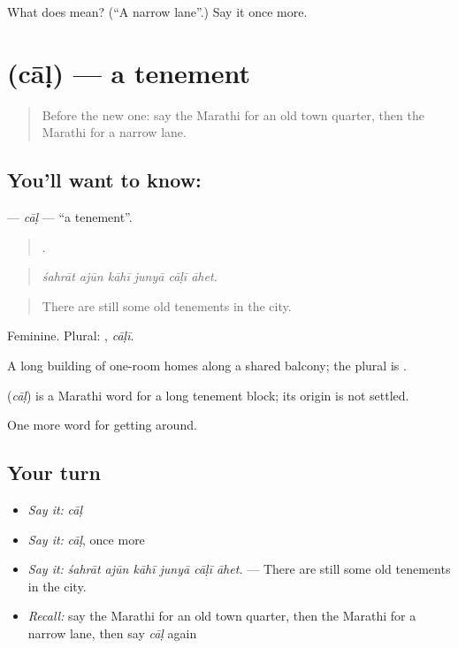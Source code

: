 \begin{tcolorbox}[breakable,colback=teal!4,colframe=teal!35!black,title={Before you move on}]
What does  mean? (\textquotedblleft{}A narrow lane\textquotedblright{}.) Say it once more.
\end{tcolorbox}
\section[\texorpdfstring{\mr{चाळ} (cāḷ)}{चाळ (cāḷ)}]{ (cāḷ) — a tenement}

\label{lesson:MR-C419-cal}



\begin{quote}
Before the new one: say the Marathi for an old town quarter, then the Marathi for a narrow lane.
\end{quote}

\subsection*{You'll want to know: }
\textbf{} — \emph{cāḷ} — \textquotedblleft{}a tenement\textquotedblright{}.

\begin{quote}
     .
\end{quote}

\begin{quote}
\emph{śahrāt ajūn kāhī junyā cāḷī āhet.}
\end{quote}

\begin{quote}
There are still some old tenements in the city.
\end{quote}

Feminine. Plural: , \emph{cāḷī}.

A long building of one-room homes along a shared balcony; the plural is .

\begin{cousinweb}
\textbf{} (\emph{cāḷ}) is a Marathi word for a long tenement block; its origin is not settled.
\end{cousinweb}

\begin{grammarlens}[title={What you've built}]
One more word for getting around.
\end{grammarlens}

\subsection*{Your turn}
\begin{itemize}
\raggedright
  \item \emph{Say it:} \emph{cāḷ}
  \item \emph{Say it:} \emph{cāḷ}, once more
  \item \emph{Say it:} \emph{śahrāt ajūn kāhī junyā cāḷī āhet.} — There are still some old tenements in the city.
  \item \emph{Recall:} say the Marathi for an old town quarter, then the Marathi for a narrow lane, then say \emph{cāḷ} again
\end{itemize}


